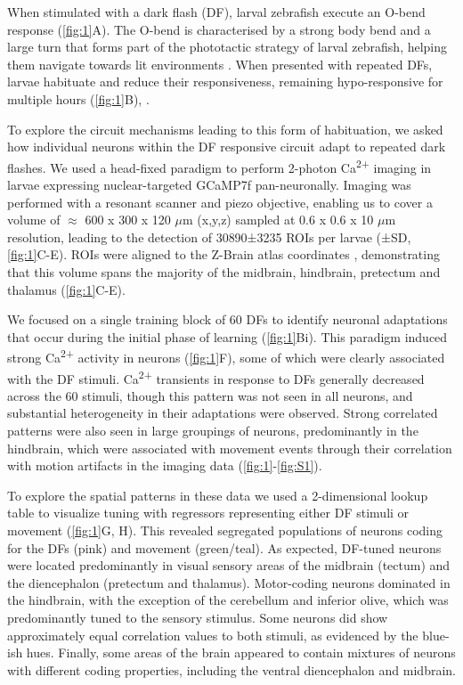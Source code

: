 \documentclass[9pt,lineno]{RandlettLab_elife}
\begin{document}
When stimulated with a dark flash (DF), larval zebrafish execute an O-bend response (\autoref{fig:1}A). The O-bend is characterised by a strong body bend and a large turn that forms part of the phototactic strategy of larval zebrafish, helping them navigate towards lit environments \citep{Burgess2007-gq, Chen2014-qq}. When presented with repeated DFs, larvae habituate and reduce their responsiveness, remaining hypo-responsive for multiple hours (\autoref{fig:1}B), \citep{Randlett2019-fi}. 

To explore the circuit mechanisms leading to this form of habituation, we asked how individual neurons within the DF responsive circuit adapt to repeated dark flashes. We used a head-fixed paradigm to perform 2-photon Ca\textsuperscript{2+} imaging in larvae expressing nuclear-targeted GCaMP7f pan-neuronally. Imaging was performed with a resonant scanner and piezo objective, enabling us to cover a volume of $\approx$ 600 x 300 x 120 $\mu$m (x,y,z) sampled at 0.6 x 0.6 x 10 $\mu$m resolution, leading to the detection of 30890±3235 ROIs per larvae (±SD, \autoref{fig:1}C-E). ROIs were aligned to the Z-Brain atlas coordinates \citep{Randlett2015-hy}, demonstrating that this volume spans the majority of the midbrain, hindbrain, pretectum and thalamus (\autoref{fig:1}C-E). 

We focused on a single training block of 60 DFs to identify neuronal adaptations that occur during the initial phase of learning (\autoref{fig:1}Bi). This paradigm induced strong Ca\textsuperscript{2+} activity in neurons (\autoref{fig:1}F), some of which were clearly associated with the DF stimuli. Ca\textsuperscript{2+} transients in response to DFs generally decreased across the 60 stimuli, though this pattern was not seen in all neurons, and substantial heterogeneity in their adaptations were observed. Strong correlated patterns were also seen in large groupings of neurons, predominantly in the hindbrain, which were associated with movement events through their correlation with motion artifacts in the imaging data (\autoref{fig:1}-\autoref{fig:S1}). 

To explore the spatial patterns in these data we used a 2-dimensional lookup table to visualize tuning with regressors representing either DF stimuli or movement (\autoref{fig:1}G, H). This revealed segregated populations of neurons coding for the DFs (pink) and movement (green/teal). As expected, DF-tuned neurons were located predominantly in visual sensory areas of the midbrain (tectum) and the diencephalon (pretectum and thalamus). Motor-coding neurons dominated in the hindbrain, with the exception of the cerebellum and inferior olive, which was predominantly tuned to the sensory stimulus. Some neurons did show approximately equal correlation values to both stimuli, as evidenced by the blue-ish hues. Finally, some areas of the brain appeared to contain mixtures of neurons with different coding properties, including the ventral diencephalon and midbrain. 
\end{document}
